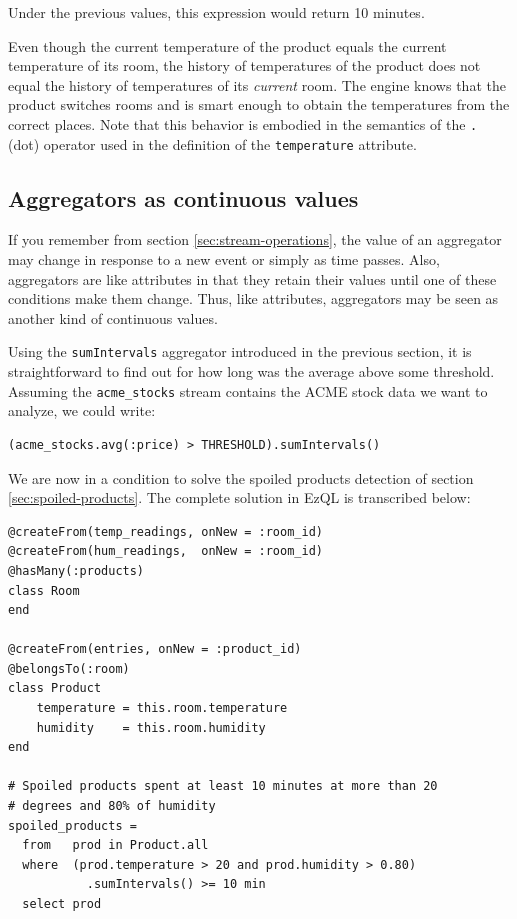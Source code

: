 \documentclass{report}
\begin{document}
Under the previous values, this expression would return 10 minutes.

Even though the current temperature of the product equals the current
temperature of its room, the history of temperatures of the product
does not equal the history of temperatures of its \emph{current}
room. The engine knows that the product switches rooms and is smart
enough to obtain the temperatures from the correct places. Note that
this behavior is embodied in the semantics of the \verb=.= (dot)
operator used in the definition of the \verb=temperature=
attribute.

\subsection{Aggregators as continuous values}
\label{sec:aggregators-continuous-values}

If you remember from section \ref{sec:stream-operations}, the value of
an aggregator may change in response to a new event or simply as time
passes. Also, aggregators are like attributes in that they retain
their values until one of these conditions make them change. Thus,
like attributes, aggregators may be seen as another kind of continuous
values.

Using the \verb=sumIntervals= aggregator introduced in the previous
section, it is straightforward to find out for how long was the
average above some threshold. Assuming the \verb=acme_stocks= stream
contains the ACME stock data we want to analyze, we could write:

\begin{verbatim}
(acme_stocks.avg(:price) > THRESHOLD).sumIntervals()
\end{verbatim}


We are now in a condition to solve the spoiled products detection of
section \ref{sec:spoiled-products}. The complete solution in EzQL is
transcribed below:


\begin{verbatim}
@createFrom(temp_readings, onNew = :room_id)
@createFrom(hum_readings,  onNew = :room_id)
@hasMany(:products)
class Room
end

@createFrom(entries, onNew = :product_id)
@belongsTo(:room)
class Product
    temperature = this.room.temperature
    humidity    = this.room.humidity
end

# Spoiled products spent at least 10 minutes at more than 20
# degrees and 80% of humidity
spoiled_products =
  from   prod in Product.all
  where  (prod.temperature > 20 and prod.humidity > 0.80)
           .sumIntervals() >= 10 min
  select prod
\end{verbatim}
\end{document}
